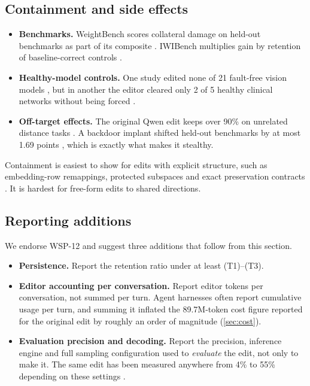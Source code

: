 \subsection{Containment and side effects}
\label{sec:contain}

\begin{itemize}[leftmargin=*,itemsep=2pt]
\item \textbf{Benchmarks.} WeightBench scores collateral damage on held-out benchmarks as part of its composite \citep{ax2611_18553}. IWIBench multiplies gain by retention of baseline-correct controls \citep{ax2611_08647}.
\item \textbf{Healthy-model controls.} One study edited none of 21 fault-free vision models \citep{ax2611_28781}, but in another the editor cleared only 2 of 5 healthy clinical networks without being forced \citep{ax2611_05341}.
\item \textbf{Off-target effects.} The original Qwen edit keeps over 90\% on unrelated distance tasks \citep{ax2611_27089}. A backdoor implant shifted held-out benchmarks by at most 1.69 points \citep{ax2611_27920}, which is exactly what makes it stealthy.
\end{itemize}
Containment is easiest to show for edits with explicit structure, such as embedding-row remappings, protected subspaces and exact preservation contracts \citep{ax2611_09376,zen23933590}. It is hardest for free-form edits to shared directions.

\subsection{Reporting additions}
\label{sec:reporting}

We endorse WSP-12 \citep{turkoglu2026survey} and suggest three additions that follow from this section.
\begin{itemize}[leftmargin=*,itemsep=2pt]
\item \textbf{Persistence.} Report the retention ratio under at least (T1)--(T3).
\item \textbf{Editor accounting per conversation.} Report editor tokens per conversation, not summed per turn. Agent harnesses often report cumulative usage per turn, and summing it inflated the 89.7M-token cost figure reported for the original edit by roughly an order of magnitude (\cref{sec:cost}).
\item \textbf{Evaluation precision and decoding.} Report the precision, inference engine and full sampling configuration used to \emph{evaluate} the edit, not only to make it. The same edit has been measured anywhere from 4\% to 55\% depending on these settings \citep{zen24235217,zen24058693}.
\end{itemize}
